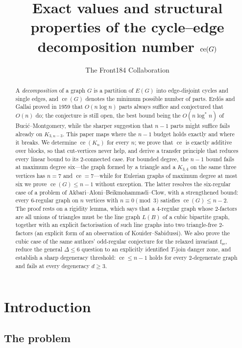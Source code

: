 \documentclass[a4paper,11pt]{amsart}
\title[The cycle--edge decomposition number of a graph]{Exact values and structural properties of the cycle--edge decomposition number $\ce(G)$}
\author{The Front184 Collaboration}
\theoremstyle{definition}
\theoremstyle{remark}
\newcommand{\ce}{\operatorname{ce}}
\newcommand{\fre}{\operatorname{f_{re}}}
\begin{document}
\begin{abstract}
A \emph{decomposition} of a graph $G$ is a partition of $E(G)$ into edge-disjoint cycles and single edges,
and $\ce(G)$ denotes the minimum possible number of parts. Erd\H{o}s and Gallai proved in 1959 that
$O(n\log n)$ parts always suffice and conjectured that $O(n)$ do; the conjecture is still open, the best
bound being the $O(n\log^* n)$ of Buci\'c--Montgomery, while the sharper suggestion that $n-1$ parts might
suffice fails already on $K_{3,n-3}$. This paper maps where the $n-1$ budget holds exactly and where it
breaks. We determine $\ce(K_n)$ for every $n$; we prove that $\ce$ is exactly additive over blocks, so that
cut-vertices never help, and derive a transfer principle that reduces every linear bound to its
$2$-connected case. For bounded degree, the $n-1$ bound fails at maximum degree six---the graph formed by a
triangle and a $K_{3,4}$ on the same three vertices has $n=7$ and $\ce=7$---while for Eulerian graphs of
maximum degree at most six we prove $\ce(G)\le n-1$ without exception. The latter resolves the six-regular
case of a problem of Akbari--Aloni--Beikmohammadi--Clow, with a strengthened bound: every $6$-regular graph
on $n$ vertices with $n\equiv 0\pmod 3$ satisfies $\ce(G)\le n-2$. The proof rests on a rigidity lemma,
which says that a $4$-regular graph whose $2$-factors are all unions of triangles must be the line graph
$L(B)$ of a cubic bipartite graph, together with an explicit factorisation of such line graphs into two
triangle-free $2$-factors (an explicit form of an observation of Kouider--Sabidussi). We also prove the
cubic case of the same authors' odd-regular conjecture for the relaxed invariant $\fre$, reduce the general
$\Delta\le 6$ question to an explicitly identified $T$-join danger zone, and establish a sharp degeneracy
threshold: $\ce\le n-1$ holds for every $2$-degenerate graph and fails at every degeneracy $d\ge 3$.
\end{abstract}

\maketitle

\tableofcontents

\section{Introduction}\label{sec:intro}

\subsection{The problem}
\end{document}
